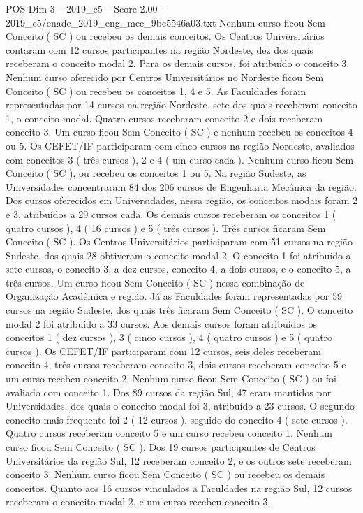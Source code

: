 \begin{textsample}{POS Dim 3 – 2019\_c5 – Score 2.00 – 2019\_c5/enade\_2019\_eng\_mec\_9be5546a03.txt}
Nenhum curso ficou Sem Conceito ( SC ) ou recebeu os demais conceitos.
Os Centros Universitários contaram com 12 cursos participantes na região Nordeste, dez dos quais receberam o conceito modal 2.
Para os demais cursos, foi atribuído o conceito 3.
Nenhum curso oferecido por Centros Universitários no Nordeste ficou Sem Conceito ( SC ) ou recebeu os conceitos 1, 4 e 5.
As Faculdades foram representadas por 14 cursos na região Nordeste, sete dos quais receberam conceito 1, o conceito modal.
Quatro cursos receberam conceito 2 e dois receberam conceito 3.
Um curso ficou Sem Conceito ( SC ) e nenhum recebeu os conceitos 4 ou 5.
Os CEFET/IF participaram com cinco cursos na região Nordeste, avaliados com conceitos 3 ( três cursos ), 2 e 4 ( um curso cada ).
Nenhum curso ficou Sem Conceito ( SC ), ou recebeu os conceitos 1 ou 5.
Na região Sudeste, as Universidades concentraram 84 dos 206 cursos de Engenharia Mecânica da região.
Dos cursos oferecidos em Universidades, nessa região, os conceitos modais foram 2 e 3, atribuídos a 29 cursos cada.
Os demais cursos receberam os conceitos 1 ( quatro cursos ), 4 ( 16 cursos ) e 5 ( três cursos ).
Três cursos ficaram Sem Conceito ( SC ).
Os Centros Universitários participaram com 51 cursos na região Sudeste, dos quais 28 obtiveram o conceito modal 2.
O conceito 1 foi atribuído a sete cursos, o conceito 3, a dez cursos, conceito 4, a dois cursos, e o conceito 5, a três cursos.
Um curso ficou Sem Conceito ( SC ) nessa combinação de Organização Acadêmica e região.
Já as Faculdades foram representadas por 59 cursos na região Sudeste, dos quais três ficaram Sem Conceito ( SC ).
O conceito modal 2 foi atribuído a 33 cursos.
Aos demais cursos foram atribuídos os conceitos 1 ( dez cursos ), 3 ( cinco cursos ), 4 ( quatro cursos ) e 5 ( quatro cursos ).
Os CEFET/IF participaram com 12 cursos, seis deles receberam conceito 4, três cursos receberam conceito 3, dois cursos receberam conceito 5 e um curso recebeu conceito 2.
Nenhum curso ficou Sem Conceito ( SC ) ou foi avaliado com conceito 1.
Dos 89 cursos da região Sul, 47 eram mantidos por Universidades, dos quais o conceito modal foi 3, atribuído a 23 cursos.
O segundo conceito mais frequente foi 2 ( 12 cursos ), seguido do conceito 4 ( sete cursos ).
Quatro cursos receberam conceito 5 e um curso recebeu conceito 1.
Nenhum curso ficou Sem Conceito ( SC ).
Dos 19 cursos participantes de Centros Universitários da região Sul, 12 receberam conceito 2, e os outros sete receberam conceito 3.
Nenhum curso ficou Sem Conceito ( SC ) ou recebeu os demais conceitos.
Quanto aos 16 cursos vinculados a Faculdades na região Sul, 12 cursos receberam o conceito modal 2, e um curso recebeu conceito 3.

\end{textsample}

